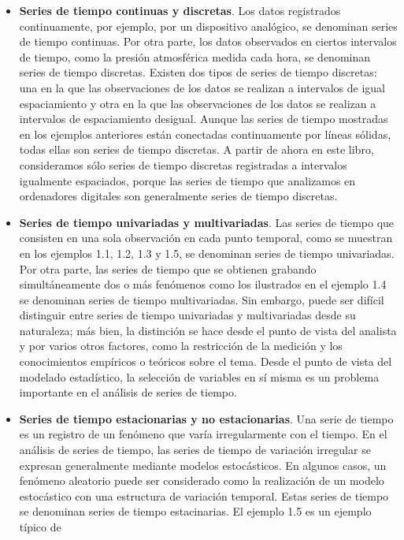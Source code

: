 \documentclass[12pt,]{krantz}
\theoremstyle{definition}
\theoremstyle{definition}
\theoremstyle{definition}
\theoremstyle{remark}
\begin{document}
\begin{itemize}
\item
  \textbf{Series de tiempo continuas y discretas}. Los datos registrados
  continuamente, por ejemplo, por un dispositivo analógico, se denominan
  series de tiempo continuas. Por otra parte, los datos observados en
  ciertos intervalos de tiempo, como la presión atmosférica medida cada
  hora, se denominan series de tiempo discretas. Existen dos tipos de
  series de tiempo discretas: una en la que las observaciones de los
  datos se realizan a intervalos de igual espaciamiento y otra en la que
  las observaciones de los datos se realizan a intervalos de
  espaciamiento desigual. Aunque las series de tiempo mostradas en los
  ejemplos anteriores están conectadas continuamente por líneas sólidas,
  todas ellas son series de tiempo discretas. A partir de ahora en este
  libro, consideramos sólo series de tiempo discretas registradas a
  intervalos igualmente espaciados, porque las series de tiempo que
  analizamos en ordenadores digitales son generalmente series de tiempo
  discretas.
\item
  \textbf{Series de tiempo univariadas y multivariadas}. Las series de
  tiempo que consisten en una sola observación en cada punto temporal,
  como se muestran en los ejemplos 1.1, 1.2, 1.3 y 1.5, se denominan
  series de tiempo univariadas. Por otra parte, las series de tiempo que
  se obtienen grabando simultáneamente dos o más fenómenos como los
  ilustrados en el ejemplo 1.4 se denominan series de tiempo
  multivariadas. Sin embargo, puede ser difícil distinguir entre series
  de tiempo univariadas y multivariadas desde su naturaleza; más bien,
  la distinción se hace desde el punto de vista del analista y por
  varios otros factores, como la restricción de la medición y los
  conocimientos empíricos o teóricos sobre el tema. Desde el punto de
  vista del modelado estadístico, la selección de variables en sí misma
  es un problema importante en el análisis de series de tiempo.
\item
  \textbf{Series de tiempo estacionarias y no estacionarias}. Una serie
  de tiempo es un registro de un fenómeno que varía irregularmente con
  el tiempo. En el análisis de series de tiempo, las series de tiempo de
  variación irregular se expresan generalmente mediante modelos
  estocásticos. En algunos casos, un fenómeno aleatorio puede ser
  considerado como la realización de un modelo estocástico con una
  estructura de variación temporal. Estas series de tiempo se denominan
  series de tiempo estacinarias. El ejemplo 1.5 es un ejemplo típico de

\end{itemize}
\end{document}
